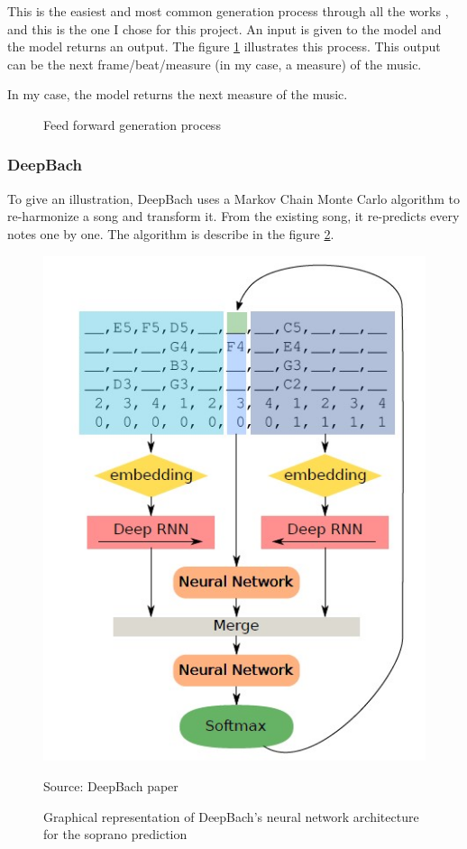 \documentclass[12pt]{report}
\begin{document}
This is the easiest and most common generation process through all the works \cite{liang_automatic_2017, chuan_modeling_nodate, huang_counterpoint_2017, wu_hierarchical_2018}, and this is the one I chose for this project.
An input is given to the model and the model returns an output.
The figure \ref{fig:feed_forward_generation_process} illustrates this process.
This output can be the next frame/beat/measure (in my case, a measure) of the music.

In my case, the model returns the next measure of the music.

\begin{figure}[h]
\begin{center}
\caption{Feed forward generation process}
\label{fig:feed_forward_generation_process}
\end{center}
\end{figure}

\subsubsection{DeepBach}

To give an illustration, DeepBach \cite{hadjeres_deepbach:_2016} uses a Markov Chain Monte Carlo algorithm to re-harmonize a song and transform it. 
From the existing song, it re-predicts every notes one by one.
The algorithm is describe in the figure \ref{fig:relatedworks:deepbach_architecture}.

\begin{figure}[htbp]
     \centering
     \includegraphics[width=.5\linewidth]{images/related_works/deepbach/deepbach_algo.jpg}
     \caption{Graphical representation of DeepBach's neural network architecture for the soprano prediction}
     Source: DeepBach paper \cite{hadjeres_deepbach:_2016}
     \label{fig:relatedworks:deepbach_architecture}
\end{figure}
\end{document}
